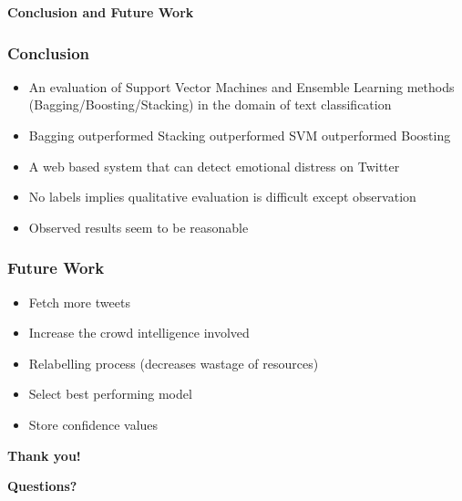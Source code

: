 \documentclass{beamer}
\begin{document}
    \begin{frame}
        \begin{center}
            \textbf{Conclusion and Future Work}
        \end{center}
    \end{frame}
    
    \begin{frame}
        \frametitle{Conclusion}
        \begin{itemize}
            \item{An evaluation of Support Vector Machines and Ensemble Learning methods (Bagging/Boosting/Stacking) in the domain of text classification}
            \item{Bagging outperformed Stacking outperformed SVM outperformed Boosting}
            \item{A web based system that can detect emotional distress on Twitter}
            \item{No labels implies qualitative evaluation is difficult except observation}
            \item{Observed results seem to be reasonable}
        \end{itemize}
    \end{frame}
    
    \begin{frame}
        \frametitle{Future Work}
        \begin{itemize}
            \item{Fetch more tweets}
            \item{Increase the crowd intelligence involved}
            \item{Relabelling process (decreases wastage of resources)}
            \item{Select best performing model}
            \item{Store confidence values}
        \end{itemize}
    \end{frame}
    
    \begin{frame}
        \begin{center}
            \textbf{Thank you!}
        \end{center}
        \begin{center}
            \textbf{Questions?}
        \end{center}
    \end{frame}
\end{document}
